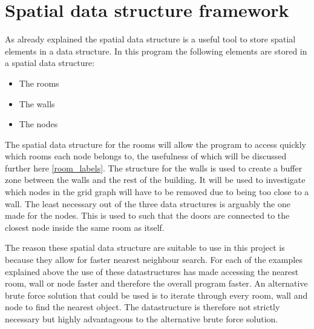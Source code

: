 

\section{Spatial data structure framework}
As already explained the spatial data structure is a useful tool to store spatial elements in a data structure. In this program the following elements are stored in a spatial data structure:
\begin{itemize}
    \item The rooms
    \item The walls
    \item The nodes
\end{itemize}
The spatial data structure for the rooms will allow the program to access quickly which rooms each node belongs to, the usefulness of which will be discussed further here \ref{room_labels}.
The structure for the walls is used to create a buffer zone between the walls and the rest of the building. It will be used to investigate which nodes in the grid graph will have to be removed due to being too close to a wall.
The least necessary out of the three data structures is arguably the one made for the nodes. This is used to such that the doors are connected to the closest node inside the same room as itself. 

The reason these spatial data structure are suitable to use in this project is because they allow for faster nearest neighbour search. For each of the examples explained above the use of these datastructures has made accessing the nearest room, wall or node faster and therefore the overall program faster.
An alternative brute force solution that could be used is to iterate through every room, wall and node to find the nearest object. The datastructure is therefore not strictly necessary but highly advantageous to the alternative brute force solution. 

